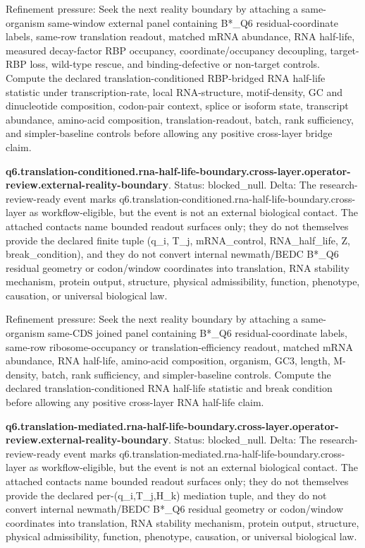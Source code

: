 Refinement pressure: Seek the next reality boundary by attaching a same-organism same-window external panel containing B*\_Q6 residual-coordinate labels, same-row translation readout, matched mRNA abundance, RNA half-life, measured decay-factor RBP occupancy, coordinate/occupancy decoupling, target-RBP loss, wild-type rescue, and binding-defective or non-target controls. Compute the declared translation-conditioned RBP-bridged RNA half-life statistic under transcription-rate, local RNA-structure, motif-density, GC and dinucleotide composition, codon-pair context, splice or isoform state, transcript abundance, amino-acid composition, translation-readout, batch, rank sufficiency, and simpler-baseline controls before allowing any positive cross-layer bridge claim.

\textbf{q6.translation-conditioned.rna-half-life-boundary.cross-layer.operator-review.external-reality-boundary}. Status: blocked\_null. Delta: The research-review-ready event marks q6.translation-conditioned.rna-half-life-boundary.cross-layer as workflow-eligible, but the event is not an external biological contact. The attached contacts name bounded readout surfaces only; they do not themselves provide the declared finite tuple (q\_i, T\_j, mRNA\_control, RNA\_half\_life, Z, break\_condition), and they do not convert internal newmath/BEDC B*\_Q6 residual geometry or codon/window coordinates into translation, RNA stability mechanism, protein output, structure, physical admissibility, function, phenotype, causation, or universal biological law.

Refinement pressure: Seek the next reality boundary by attaching a same-organism same-CDS joined panel containing B*\_Q6 residual-coordinate labels, same-row ribosome-occupancy or translation-efficiency readout, matched mRNA abundance, RNA half-life, amino-acid composition, organism, GC3, length, M-density, batch, rank sufficiency, and simpler-baseline controls. Compute the declared translation-conditioned RNA half-life statistic and break condition before allowing any positive cross-layer RNA half-life claim.

\textbf{q6.translation-mediated.rna-half-life-boundary.cross-layer.operator-review.external-reality-boundary}. Status: blocked\_null. Delta: The research-review-ready event marks q6.translation-mediated.rna-half-life-boundary.cross-layer as workflow-eligible, but the event is not an external biological contact. The attached contacts name bounded readout surfaces only; they do not themselves provide the declared per-(q\_i,T\_j,H\_k) mediation tuple, and they do not convert internal newmath/BEDC B*\_Q6 residual geometry or codon/window coordinates into translation, RNA stability mechanism, protein output, structure, physical admissibility, function, phenotype, causation, or universal biological law.

